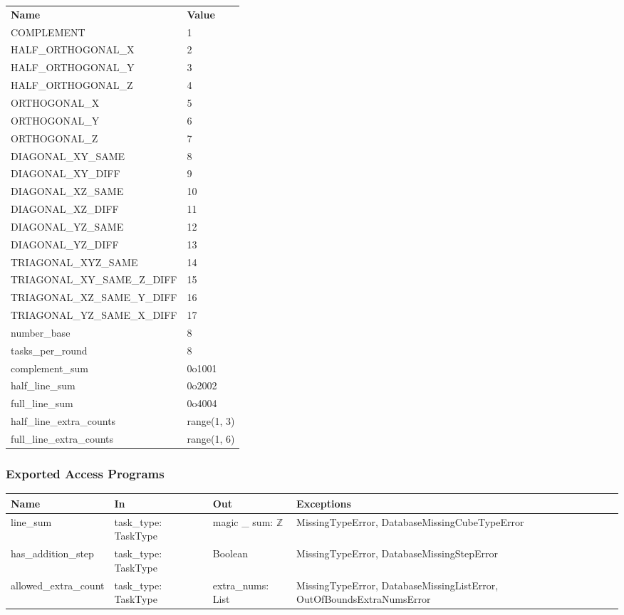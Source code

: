 \documentclass[12pt, titlepage]{article}
\begin{document}
\begin{center}
\begin{tabular}{p{10cm} p{4cm}}
\hline
\textbf{Name} & \textbf{Value}\\
COMPLEMENT & 1 \\
HALF\_ORTHOGONAL\_X & 2 \\
HALF\_ORTHOGONAL\_Y & 3 \\
HALF\_ORTHOGONAL\_Z & 4 \\
ORTHOGONAL\_X & 5 \\
ORTHOGONAL\_Y & 6 \\
ORTHOGONAL\_Z & 7 \\
DIAGONAL\_XY\_SAME & 8 \\
DIAGONAL\_XY\_DIFF & 9 \\
DIAGONAL\_XZ\_SAME & 10 \\
DIAGONAL\_XZ\_DIFF & 11 \\
DIAGONAL\_YZ\_SAME & 12 \\
DIAGONAL\_YZ\_DIFF & 13 \\
TRIAGONAL\_XYZ\_SAME & 14 \\
TRIAGONAL\_XY\_SAME\_Z\_DIFF & 15 \\
TRIAGONAL\_XZ\_SAME\_Y\_DIFF & 16 \\
TRIAGONAL\_YZ\_SAME\_X\_DIFF & 17 \\
number\_base&8 \\
tasks\_per\_round&8 \\
complement\_sum&0o1001 \\
half\_line\_sum&0o2002 \\
full\_line\_sum&0o4004 \\
half\_line\_extra\_counts&range(1, 3) \\
full\_line\_extra\_counts&range(1, 6) \\
\hline


\hline
\end{tabular}
\end{center}

\subsubsection{Exported Access Programs}

\begin{center}
\begin{tabular}{p{4cm} p{4cm} p{4cm} p{4cm}}
\hline
\textbf{Name} & \textbf{In} & \textbf{Out} & \textbf{Exceptions} \\
\hline
line\_sum & task\_type: TaskType & magic \_ sum: $\mathbb{Z}$ & MissingTypeError, DatabaseMissingCubeTypeError \\
has\_addition\_step & task\_type: TaskType & Boolean & MissingTypeError, DatabaseMissingStepError \\
allowed\_extra\_count & task\_type: TaskType & extra\_nums: List & MissingTypeError, DatabaseMissingListError, OutOfBoundsExtraNumsError \\
\hline
\end{tabular}
\end{center}
\end{document}
